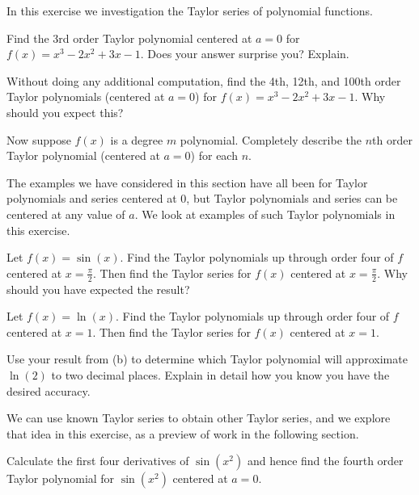 \begin{exercises}
\item In this exercise we investigation the Taylor series of polynomial functions.
    \ba
    \item Find the 3rd order Taylor polynomial centered at $a = 0$ for $f(x) = x^3-2x^2+3x-1$. Does your answer surprise you? Explain.

    \item Without doing any additional computation, find the 4th, 12th, and 100th order Taylor polynomials (centered at $a = 0$) for $f(x) = x^3-2x^2+3x-1$. Why should you expect this?

    \item Now suppose $f(x)$ is a degree $m$ polynomial. Completely describe the $n$th order Taylor polynomial (centered at $a = 0$) for each $n$.

    \ea


\item The examples we have considered in this section have all been for Taylor polynomials and series centered at 0, but Taylor polynomials and series can be centered at any value of $a$. We look at examples of such Taylor polynomials in this exercise.
    \ba
    \item Let $f(x) = \sin(x)$. Find the Taylor polynomials up through order four of $f$ centered at $x = \frac{\pi}{2}$. Then find the Taylor series for $f(x)$ centered at $x = \frac{\pi}{2}$. Why should you have expected the result?

    \item Let $f(x) = \ln(x)$. Find the Taylor polynomials up through order four of $f$ centered at $x = 1$. Then find the Taylor series for $f(x)$ centered at $x = 1$.

    \item Use your result from (b) to determine which Taylor polynomial will approximate $\ln(2)$ to two decimal places. Explain in detail how you know you have the desired accuracy.

    \ea


\item We can use known Taylor series to obtain other Taylor series, and we explore that idea in this exercise, as a preview of work in the following section.
    \ba
    \item Calculate the first four derivatives of $\sin(x^2)$ and hence find the fourth order Taylor polynomial for $\sin(x^2)$ centered at $a=0$.


\end{exercises}
